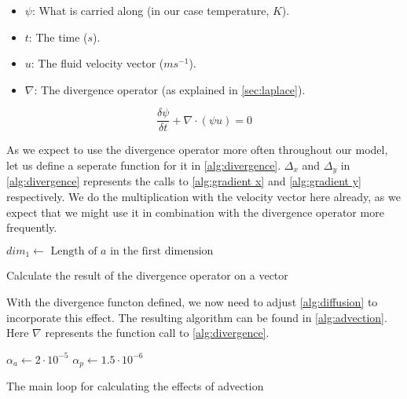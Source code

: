 \begin{itemize}
    \item $\psi$: What is carried along (in our case temperature, $K$).
    \item $t$: The time ($s$).
    \item $u$: The fluid velocity vector ($ms^{-1}$).
    \item $\nabla$: The divergence operator (as explained in \autoref{sec:laplace}).
\end{itemize}

\begin{equation}
    \frac{\delta \psi}{\delta t} + \nabla \cdot (\psi u) = 0
    \label{eq:advection}
\end{equation}

As we expect to use the divergence operator more often throughout our model, let us define a seperate function for it in \autoref{alg:divergence}. $\Delta_x$ and $\Delta_y$ in 
\autoref{alg:divergence} represents the calls to \autoref{alg:gradient x} and \autoref{alg:gradient y} respectively. We do the multiplication with the velocity vector here already, as we expect 
that we might use it in combination with the divergence operator more frequently.

\begin{algorithm}
    $dim_1 \leftarrow \text{ Length of } a \text{ in the first dimension}$ \;
     \;
    \caption{Calculate the result of the divergence operator on a vector}
    \label{alg:divergence}
\end{algorithm}

With the divergence functon defined, we now need to adjust \autoref{alg:diffusion} to incorporate this effect. The resulting algorithm can be found in \autoref{alg:advection}. Here $\nabla$
represents the function call to \autoref{alg:divergence}.

\begin{algorithm}
    $\alpha_a \leftarrow 2 \cdot 10^{-5}$ \;
    $\alpha_p \leftarrow 1.5 \cdot 10^{-6}$ \;
    \caption{The main loop for calculating the effects of advection}
    \label{alg:advection}
\end{algorithm}

